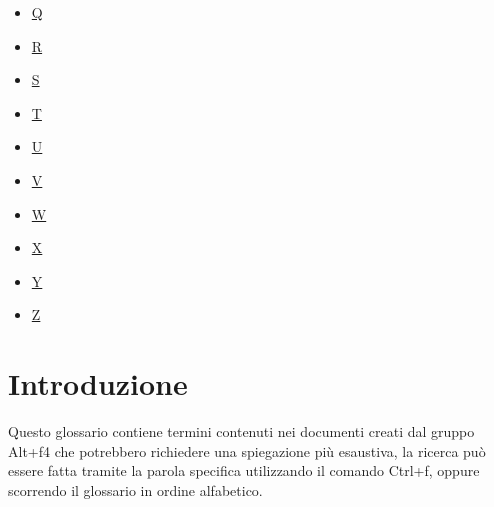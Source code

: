 \documentclass[a4paper,12pt]{article}
\begin{document}
\begin{itemize}
\begin{itemize}
        \item \hyperref[sec:glossario]{\gls{Q}}
        \item \hyperref[sec:glossario]{\gls{R}}
        \item \hyperref[sec:glossario]{\gls{S}}
        \item \hyperref[sec:glossario]{\gls{T}}
        \item \hyperref[sec:glossario]{\gls{U}}
        \item \hyperref[sec:glossario]{\gls{V}}
        \item \hyperref[sec:glossario]{\gls{W}}
        \item \hyperref[sec:glossario]{\gls{X}}
        \item \hyperref[sec:glossario]{\gls{Y}}
        \item \hyperref[sec:glossario]{\gls{Z}}
    \end{itemize}
\end{itemize}


\section*{Introduzione}
\label{sec:introduzione}
Questo glossario contiene termini contenuti nei documenti creati dal gruppo Alt+f4 che potrebbero richiedere una spiegazione più esaustiva,
 la ricerca può essere fatta tramite la parola specifica utilizzando il comando Ctrl+f, oppure scorrendo il glossario in ordine alfabetico.

\label{sec:glossario}

\printnoidxglossaries
\end{document}
